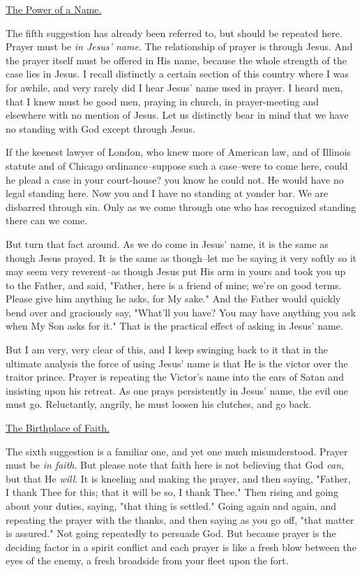 \underline{The Power of a Name.}


The fifth suggestion has already been referred to, but should be repeated
here. Prayer must be \textit{in Jesus' name}. The relationship of prayer is
through Jesus. And the prayer itself must be offered in His name, because
the whole strength of the case lies in Jesus. I recall distinctly a
certain section of this country where I was for awhile, and very rarely
did I hear Jesus' name used in prayer. I heard men, that I knew must be
good men, praying in church, in prayer-meeting and elsewhere with no
mention of Jesus. Let us distinctly bear in mind that we have no standing
with God except through Jesus.

If the keenest lawyer of London, who knew more of American law, and of
Illinois statute and of Chicago ordinance--suppose such a case--were to
come here, could he plead a case in your court-house? you know he could
not. He would have no legal standing here. Now you and I have no standing
at yonder bar. We are disbarred through sin. Only as we come through one
who has recognized standing there can we come.

But turn that fact around. As we do come in Jesus' name, it is the same as
though Jesus prayed. It is the same as though--let me be saying it very
softly so it may seem very reverent--as though Jesus put His arm in yours
and took you up to the Father, and said, "Father, here is a friend of
mine; we're on good terms. Please give him anything he asks, for My sake."
And the Father would quickly bend over and graciously say, "What'll you
have? You may have anything you ask when My Son asks for it." That is the
practical effect of asking in Jesus' name.

But I am very, very clear of this, and I keep swinging back to it that in
the ultimate analysis the force of using Jesus' name is that He is the
victor over the traitor prince. Prayer is repeating the Victor's name into
the ears of Satan and insisting upon his retreat. As one prays
persistently in Jesus' name, the evil one must go. Reluctantly, angrily,
he must loosen his clutches, and go back.



\underline{The Birthplace of Faith.}


The sixth suggestion is a familiar one, and yet one much misunderstood.
Prayer must be \textit{in faith}. But please note that faith here is not
believing that God \textit{can}, but that He \textit{will}. It is kneeling and making
the prayer, and then saying, "Father, I thank Thee for this; that it will
be so, I thank Thee." Then rising and going about your duties, saying,
"that thing is settled." Going again and again, and repeating the prayer
with the thanks, and then saying as you go off, "that matter is assured."
Not going repeatedly to persuade God. But because prayer is the deciding
factor in a spirit conflict and each prayer is like a fresh blow between
the eyes of the enemy, a fresh broadside from your fleet upon the fort.

